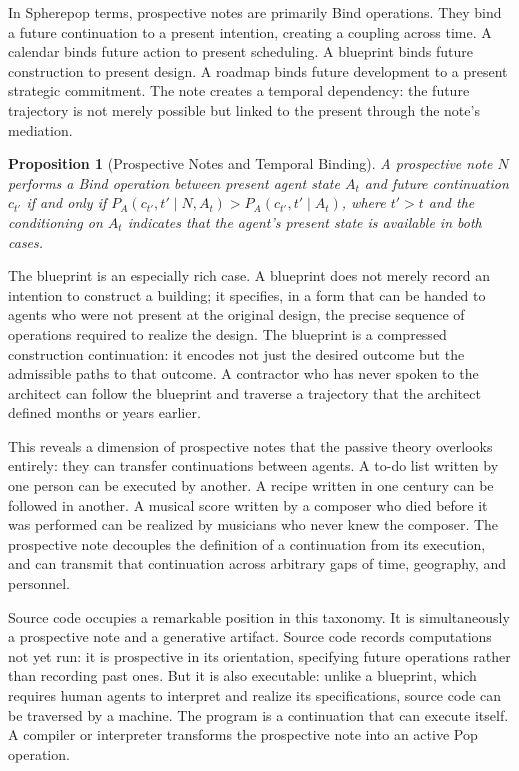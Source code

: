 \documentclass[12pt, a4paper]{article}
\theoremstyle{plain}
\newtheorem{proposition}[theorem]{Proposition}
\theoremstyle{definition}
\theoremstyle{remark}
\begin{document}
In Spherepop terms, prospective notes are primarily Bind operations. They bind a
future continuation to a present intention, creating a coupling across time. A
calendar binds future action to present scheduling. A blueprint binds future
construction to present design. A roadmap binds future development to a present
strategic commitment. The note creates a temporal dependency: the future
trajectory is not merely possible but linked to the present through the
note's mediation.

\begin{proposition}[Prospective Notes and Temporal Binding]
A prospective note $N$ performs a Bind operation between present agent state
$A_t$ and future continuation $c_{t'}$ if and only if
$P_A(c_{t'}, t' \mid N, A_t) > P_A(c_{t'}, t' \mid A_t)$,
where $t' > t$ and the conditioning on $A_t$ indicates that the agent's present
state is available in both cases.
\end{proposition}

The blueprint is an especially rich case. A blueprint does not merely record an
intention to construct a building; it specifies, in a form that can be handed to
agents who were not present at the original design, the precise sequence of
operations required to realize the design. The blueprint is a compressed
construction continuation: it encodes not just the desired outcome but the
admissible paths to that outcome. A contractor who has never spoken to the
architect can follow the blueprint and traverse a trajectory that the architect
defined months or years earlier.

This reveals a dimension of prospective notes that the passive theory overlooks
entirely: they can transfer continuations between agents. A to-do list written
by one person can be executed by another. A recipe written in one century can be
followed in another. A musical score written by a composer who died before it was
performed can be realized by musicians who never knew the composer. The prospective
note decouples the definition of a continuation from its execution, and can
transmit that continuation across arbitrary gaps of time, geography, and
personnel.

Source code occupies a remarkable position in this taxonomy. It is simultaneously
a prospective note and a generative artifact. Source code records computations not
yet run: it is prospective in its orientation, specifying future operations rather
than recording past ones. But it is also executable: unlike a blueprint, which
requires human agents to interpret and realize its specifications, source code can
be traversed by a machine. The program is a continuation that can execute itself.
A compiler or interpreter transforms the prospective note into an active Pop
operation.
\end{document}
